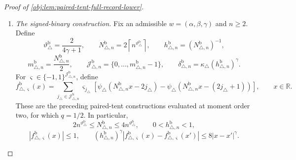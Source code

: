 \documentclass[11pt]{article}
\begin{document}
\begin{proof}[Proof of \cref{obj:lem:paired-tent-full-record-lower}]
\begin{enumerate}
For an original-record test \(\phi\), use instead
\[
\overline\phi(\mathcal D_n)
=\int_0^1\phi(\mathcal D_n,\varpi_{\mathrm{seed}})\,\lambda(d\varpi_{\mathrm{seed}}).
\]
The identical expectation comparison gives
\[
2^{-m_{\triangle,n}}\sum_\varsigma
\mathsf R_n(P_\varsigma,\phi)<\frac35.
\]
The same weighted-sum contradiction supplies a support law with type-II
error at least \(2/5\). Taking the supremum and then the infimum in
\cref{obj:def:testing-risk} proves
\[
B_n(v,r_\triangle)\ge\frac25.
\]
This completes the first witness package.

\item \emph{The signed-binary construction.}
Fix an admissible \(w=(\alpha,\beta,\gamma)\) and \(n\ge2\). Define
\[
\vartheta_\triangle^{\mathrm b}=\frac2{4\gamma+1},
\qquad
N_{\triangle,n}^{\mathrm b}
=2\left\lceil n^{\vartheta_\triangle^{\mathrm b}}\right\rceil,
\qquad
h_{\triangle,n}^{\mathrm b}=(N_{\triangle,n}^{\mathrm b})^{-1},
\]
\[
m_{\triangle,n}^{\mathrm b}=\frac{N_{\triangle,n}^{\mathrm b}}2,
\qquad
\mathscr J_{\triangle,n}^{\mathrm b}
=\{0,\ldots,m_{\triangle,n}^{\mathrm b}-1\},
\qquad
\delta_{\triangle,n}^{\mathrm b}
=\kappa_\triangle(h_{\triangle,n}^{\mathrm b})^\gamma.
\]
For \(\varsigma\in\{-1,1\}^{\mathscr J_{\triangle,n}^{\mathrm b}}\), define
\[
f_{\triangle,\varsigma}^{\mathrm b}(x)
=
\sum_{j_\triangle\in\mathscr J_{\triangle,n}^{\mathrm b}}
\varsigma_{j_\triangle}
\left[
\psi_\triangle(N_{\triangle,n}^{\mathrm b}x-2j_\triangle)
-\psi_\triangle(N_{\triangle,n}^{\mathrm b}x-(2j_\triangle+1))
\right],
\qquad x\in\mathbb R.
\]
These are the preceding paired-tent constructions evaluated at moment order
two, for which \(q=1/2\). In particular,
\[
2n^{\vartheta_\triangle^{\mathrm b}}
\le N_{\triangle,n}^{\mathrm b}
\le4n^{\vartheta_\triangle^{\mathrm b}},
\qquad
0<h_{\triangle,n}^{\mathrm b}<1,
\]
\[
|f_{\triangle,\varsigma}^{\mathrm b}(x)|\le1,
\qquad
(h_{\triangle,n}^{\mathrm b})^\gamma
|f_{\triangle,\varsigma}^{\mathrm b}(x)
-f_{\triangle,\varsigma}^{\mathrm b}(x')|
\le8|x-x'|^\gamma.
\]


\end{enumerate}
\end{proof}
\end{document}
